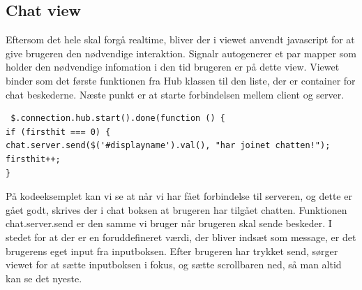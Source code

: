\subsection{Chat view}
Eftersom det hele skal forgå realtime, bliver der i viewet anvendt javascript for at give brugeren den nødvendige interaktion. Signalr autogenerer et par mapper som holder den nødvendige infomation i den tid brugeren er på dette view. 
Viewet binder som det første funktionen fra Hub klassen til den liste, der er container for chat beskederne. Næste punkt er at starte forbindelsen mellem client og server. 

\begin{lstlisting}
 $.connection.hub.start().done(function () {
if (firsthit === 0) {
chat.server.send($('#displayname').val(), "har joinet chatten!");
firsthit++;
}
\end{lstlisting}

På kodeeksemplet kan vi se at når vi har fået forbindelse til serveren, og dette er gået godt, skrives der i chat boksen at brugeren har tilgået chatten. 
Funktionen chat.server.send er den samme vi bruger når brugeren skal sende beskeder. I stedet for at der er en foruddefineret værdi, der bliver indsæt som message, er det brugerens eget input fra inputboksen. Efter brugeren har trykket send, sørger viewet for at sætte inputboksen i fokus, og sætte scrollbaren ned, så man altid kan se det nyeste. 
